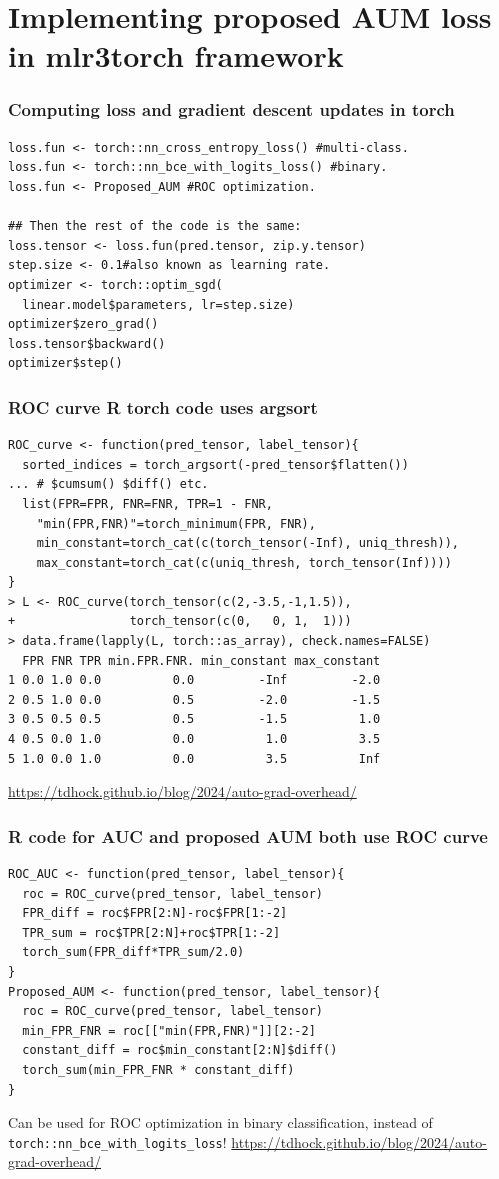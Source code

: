 \documentclass{beamer}
\begin{document}
\section{Implementing proposed AUM loss in mlr3torch framework}

\begin{frame}[fragile]
\frametitle{Computing loss and gradient descent updates in torch}
\begin{verbatim}
loss.fun <- torch::nn_cross_entropy_loss() #multi-class.
loss.fun <- torch::nn_bce_with_logits_loss() #binary.
loss.fun <- Proposed_AUM #ROC optimization.

## Then the rest of the code is the same:
loss.tensor <- loss.fun(pred.tensor, zip.y.tensor)
step.size <- 0.1#also known as learning rate.
optimizer <- torch::optim_sgd(
  linear.model$parameters, lr=step.size)
optimizer$zero_grad()
loss.tensor$backward()
optimizer$step()
\end{verbatim}
\end{frame}


\begin{frame}[fragile]
  \frametitle{ROC curve R torch code uses argsort}
\small
  \begin{verbatim}
ROC_curve <- function(pred_tensor, label_tensor){
  sorted_indices = torch_argsort(-pred_tensor$flatten())
... # $cumsum() $diff() etc.
  list(FPR=FPR, FNR=FNR, TPR=1 - FNR, 
    "min(FPR,FNR)"=torch_minimum(FPR, FNR),
    min_constant=torch_cat(c(torch_tensor(-Inf), uniq_thresh)),
    max_constant=torch_cat(c(uniq_thresh, torch_tensor(Inf))))
}
> L <- ROC_curve(torch_tensor(c(2,-3.5,-1,1.5)),
+                torch_tensor(c(0,   0, 1,  1)))
> data.frame(lapply(L, torch::as_array), check.names=FALSE)
  FPR FNR TPR min.FPR.FNR. min_constant max_constant
1 0.0 1.0 0.0          0.0         -Inf         -2.0
2 0.5 1.0 0.0          0.5         -2.0         -1.5
3 0.5 0.5 0.5          0.5         -1.5          1.0
4 0.5 0.0 1.0          0.0          1.0          3.5
5 1.0 0.0 1.0          0.0          3.5          Inf
\end{verbatim}

    \url{https://tdhock.github.io/blog/2024/auto-grad-overhead/}

\end{frame}

\begin{frame}[fragile]
  \frametitle{R code for AUC and proposed AUM both use ROC curve}

  \begin{verbatim}
ROC_AUC <- function(pred_tensor, label_tensor){
  roc = ROC_curve(pred_tensor, label_tensor)
  FPR_diff = roc$FPR[2:N]-roc$FPR[1:-2]
  TPR_sum = roc$TPR[2:N]+roc$TPR[1:-2]
  torch_sum(FPR_diff*TPR_sum/2.0)
}
Proposed_AUM <- function(pred_tensor, label_tensor){
  roc = ROC_curve(pred_tensor, label_tensor)
  min_FPR_FNR = roc[["min(FPR,FNR)"]][2:-2]
  constant_diff = roc$min_constant[2:N]$diff()
  torch_sum(min_FPR_FNR * constant_diff)
}
\end{verbatim}
  Can be used for ROC optimization in binary classification, instead
  of \verb|torch::nn_bce_with_logits_loss|!
\small  \url{https://tdhock.github.io/blog/2024/auto-grad-overhead/}
\end{frame}
\end{document}
